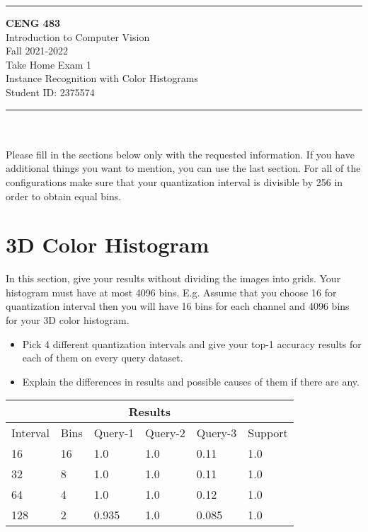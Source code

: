 \documentclass[12pt]{article}
\newcommand{\HRule}{\rule{\linewidth}{1mm}}
\begin{document}
\noindent
\HRule %
\small
\begin{center}
	\LARGE \textbf{CENG 483} \\[4mm]
	\Large Introduction to Computer Vision \\[4mm]
	\normalsize Fall 2021-2022 \\
	\Large Take Home Exam 1 \\
	\Large Instance Recognition with Color Histograms \\
    \Large Student ID: 2375574 \\
\end{center}
\HRule

\begin{center}
\end{center}
\vspace{-10mm}
\noindent\\ \\ 
Please fill in the sections below only with the requested information. If you have additional things you want to mention, you can use the last section. For all of the configurations make sure that your 
quantization interval is divisible by 256 in order to obtain equal bins.
\section{3D Color Histogram}
In this section, give your results without dividing the images into grids. Your histogram must have at most 4096 bins. E.g. Assume that you choose 16 for quantization interval then you will have 16 bins for each channel and 4096 bins for your 3D color histogram.

\begin{itemize}
\item Pick 4 different quantization intervals and give your top-1 accuracy results for each of them on every query dataset.
\item Explain the differences in results and possible causes of them if there are any.
\end{itemize}


\begin{tabular}{ |p{1.5cm}|p{1.5cm}||p{2cm}|p{2cm}|p{2cm}|p{2cm}|  }
    \hline
    \multicolumn{6}{|c|}{Results} \\
    \hline
    Interval & Bins & Query-1 & Query-2 & Query-3 & Support \\
    \hline
    16  & 16 & 1.0 & 1.0 & 0.11 & 1.0 \\
    \hline
    32  & 8 & 1.0 & 1.0 & 0.11 & 1.0 \\
    \hline
    64  & 4 & 1.0  & 1.0 & 0.12 & 1.0 \\
    \hline
    128 & 2 & 0.935 & 1.0 &  0.085 & 1.0 \\
    \hline
\end{tabular}
\end{document}
